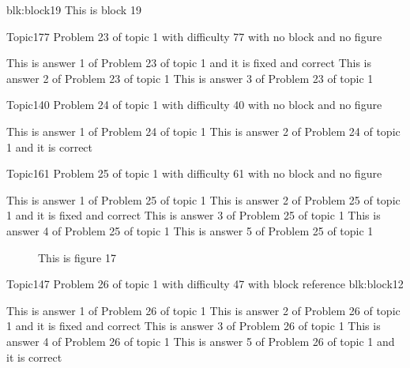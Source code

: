 \documentclass[master]{exam}
\begin{document}
\begin{block}{blk:block19}
This is block 19
\end{block}


\begin{problem}{Topic1}{77}
	Problem 23 of topic 1 with difficulty 77 with no block and no figure
	\begin{answers}
		 This is answer 1 of Problem 23 of topic 1 and it is fixed and correct
		\answer This is answer 2 of Problem 23 of topic 1 
		\answer This is answer 3 of Problem 23 of topic 1 
	\end{answers}
\end{problem}

\begin{problem}{Topic1}{40}
	Problem 24 of topic 1 with difficulty 40 with no block and no figure
	\begin{answers}
		\answer This is answer 1 of Problem 24 of topic 1 
		\answer[correct] This is answer 2 of Problem 24 of topic 1 and it is correct
	\end{answers}
\end{problem}

\begin{problem}{Topic1}{61}
	Problem 25 of topic 1 with difficulty 61 with no block and no figure
	\begin{answers}
		\answer This is answer 1 of Problem 25 of topic 1 
		 This is answer 2 of Problem 25 of topic 1 and it is fixed and correct
		\answer This is answer 3 of Problem 25 of topic 1 
		\answer This is answer 4 of Problem 25 of topic 1 
		\answer This is answer 5 of Problem 25 of topic 1 
	\end{answers}
\end{problem}



\begin{figure}
	\begin{center}
		This is figure 17 
		\label{fig:figure17}
	\end{center}
\end{figure}

\begin{problem}[requires=blk:block12]{Topic1}{47}
	Problem 26 of topic 1 with difficulty 47 with block reference blk:block12
	\begin{answers}
		\answer This is answer 1 of Problem 26 of topic 1 
		 This is answer 2 of Problem 26 of topic 1 and it is fixed and correct
		\answer This is answer 3 of Problem 26 of topic 1 
		\answer This is answer 4 of Problem 26 of topic 1 
		\answer[correct] This is answer 5 of Problem 26 of topic 1 and it is correct
	\end{answers}
\end{problem}
\end{document}
